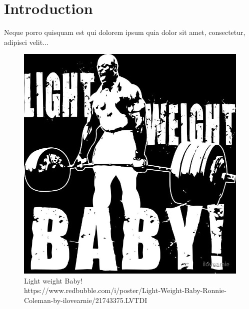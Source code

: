\chapter{Introduction}
\newpage

Neque porro quisquam est qui dolorem ipsum quia dolor sit amet, consectetur, adipisci velit...

\begin{figure}[ht]
	\begin{center}
		\includegraphics[width=0.6\linewidth]{Figures/LightWeight.jpg}
		\captionsetup{justification=centering}
		\caption[Light weight Baby!]{Light weight Baby! \\
		https://www.redbubble.com/i/poster/Light-Weight-Baby-Ronnie-Coleman-by-ilovearnie/21743375.LVTDI}
		\label{fig:cover}
	\end{center}
\end{figure}